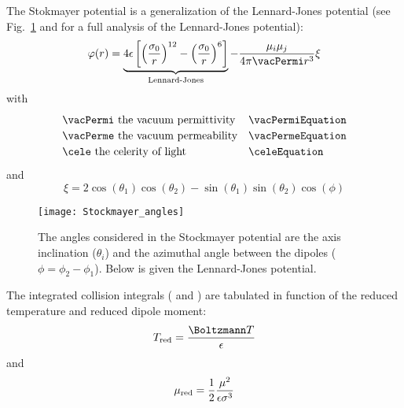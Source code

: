 The Stokmayer potential is a generalization of the Lennard-Jones potential
(see Fig.~\ref{viscosity:Stockmayer_potential} and \citet{Jasper2014} for a
full analysis of the Lennard-Jones potential):
\begin{equation}
\varphi(r) = \underbrace{4 \LJdepth \left[\left(\frac{\LJdia[0]}{r}\right)^{12} - \left(\frac{\LJdia[0]}{r}\right)^{6}\right]}_\text{Lennard-Jones}
             - \frac{\dipole[i]\dipole[j]}{4\pi \vacPermi r^3}\xi
\label{Stockmayer:equation}
\end{equation}
with 
\begin{equation}
\renewcommand{\arraystretch}{1.2}
\begin{array}{ll}
\vacPermi\text{ the vacuum permittivity} & \vacPermiEquation \\
\vacPerme\text{ the vacuum permeability} & \vacPermeEquation \\
\cele\text{ the celerity of light}       & \celeEquation
\end{array}
\end{equation}
and
\begin{equation}
\xi = 2 \cos(\theta_1)\cos(\theta_2) - \sin(\theta_1)\sin(\theta_2)\cos(\phi)
\end{equation}
\begin{figure}
\centering
\texttt{[image: Stockmayer\_angles]}
\caption[Stockmayer/Lennard-Jones potential]{\label{viscosity:Stockmayer_potential}The angles considered in the
Stockmayer potential are the axis inclination ($\theta_i$) and the azimuthal
angle between the dipoles ($\phi = \phi_2 - \phi_1$). Below is given the
Lennard-Jones potential.}
\end{figure}

The integrated collision integrals ( and ) are tabulated
in function of the reduced temperature and reduced dipole moment:
\begin{equation}
\Temp_\text{red} = \frac{\Boltzmann\Temp}{\LJdepth}
\end{equation}
and
\begin{equation}
\dipole_\text{red} = \frac{1}{2}\frac{\dipole^2}{\LJdepth\LJdia^3}
\end{equation}

